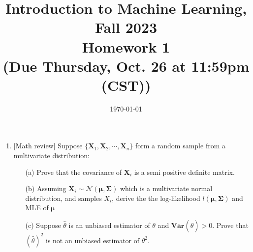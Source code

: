 \documentclass[10pt]{article}
\begin{document}
\date{\today}
\title{Introduction to Machine Learning, Fall 2023 \\
	Homework 1\\
	\small (Due Thursday, Oct. 26 at 11:59pm (CST))}
\maketitle
\begin{enumerate}[1.]


	\item {} [Math review] Suppose $\{\mathbf{X}_1, \mathbf{X}_2, \cdots, \mathbf{X}_n\}$ form a random sample from a multivariate distribution:
	      \begin{itemize}
		      \item[(a)] Prove that the covariance of $\mathbf{X}_i$ is a semi positive definite matrix. ~
		      \item[(b)] Assuming $\mathbf{X}_i\sim \mathcal{N}(\mathbf{\mu},\mathbf{\Sigma})$ which is a multivariate normal distribution, and samples $X_i$, derive the the log-likelihood $\mathit{l}(\mathbf{\mu},\mathbf{\Sigma})$ and MLE of $\mathbf{\mu}$ ~
		      \item[(c)] Suppose $\hat{\theta}$ is an unbiased estimator of $\theta$ and $\mathbf{Var}(\hat{\theta})>0$. Prove that $(\hat{\theta})^2$ is not an unbiased estimator of $\theta^2$. ~
	      \end{itemize}




	      \newpage


\end{enumerate}
\end{document}

